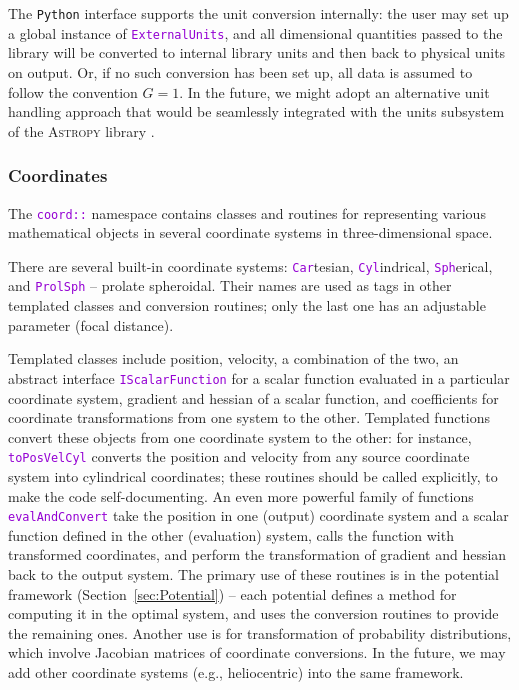 \documentclass[12pt]{article}
\newcommand{\Python}{\texttt{Python}\xspace}
\newcommand{\ttt}[1]{\textcolor{darkviolet}{\texttt{#1}}}
\begin{document}
The \Python interface supports the unit conversion internally: the user may set up a global instance of \ttt{ExternalUnits}, and all dimensional quantities passed to the library will be converted to internal library units and then back to physical units on output. Or, if no such conversion has been set up, all data is assumed to follow the convention $G=1$. In the future, we might adopt an alternative unit handling approach that would be seamlessly integrated with the units subsystem of the \textsc{Astropy} library \cite{Astropy}.


\subsubsection{Coordinates}  \label{sec:Coords}
The \ttt{coord::} namespace contains classes and routines for representing various mathematical objects in several coordinate systems in three-dimensional space.

There are several built-in coordinate systems: \ttt{Car}tesian, \ttt{Cyl}indrical, \ttt{Sph}erical, and \ttt{ProlSph} -- prolate spheroidal. Their names are used as tags in other templated classes and conversion routines; only the last one has an adjustable parameter (focal distance).

Templated classes include position, velocity, a combination of the two, an abstract interface \ttt{IScalarFunction} for a scalar function evaluated in a particular coordinate system, gradient and hessian of a scalar function, and coefficients for coordinate transformations from one system to the other. Templated functions convert these objects from one coordinate system to the other: for instance, \ttt{toPosVelCyl} converts the position and velocity from any source coordinate system into cylindrical coordinates; these routines should be called explicitly, to make the code self-documenting. An even more powerful family of functions \ttt{evalAndConvert} take the position in one (output) coordinate system and a scalar function defined in the other (evaluation) system, calls the function with transformed coordinates, and perform the transformation of gradient and hessian back to the output system. The primary use of these routines is in the potential framework (Section~\ref{sec:Potential}) -- each potential defines a method for computing it in the optimal system, and uses the conversion routines to provide the remaining ones. Another use is for transformation of probability distributions, which involve Jacobian matrices of coordinate conversions. In the future, we may add other coordinate systems (e.g., heliocentric) into the same framework.
\end{document}
